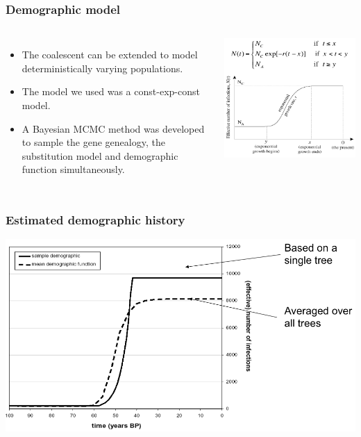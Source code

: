 \begin{frame}
\frametitle{Demographic model}

\footnotesize{
\begin{columns}[t]


\begin{itemize}
	\item The coalescent can be extended to model deterministically varying populations.
	\item The model we used was a const-exp-const model.
	\item A Bayesian MCMC method was developed to sample the gene genealogy, the substitution model and demographic function simultaneously.
\end{itemize}


\includegraphics[width=\textwidth]{../../images/DemographicModel}

\end{columns}
}

\end{frame}

\begin{frame}
\frametitle{Estimated demographic history}

\includegraphics[width=\textwidth]{../../images/DemographicHistory}

\end{frame}

